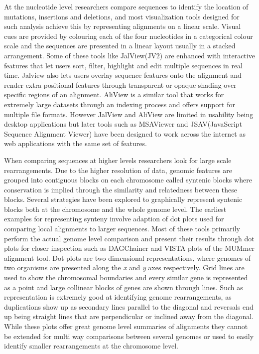At the nucleotide level researchers compare sequences to identify the location of mutations, insertions and deletions, and most visualization tools designed for such analysis achieve this by representing alignments on a linear scale. Visual cues are provided by colouring each of the four nucleotides in a categorical colour scale and the sequences are presented in a linear layout usually in a stacked arrangement. Some of these tools like JalView(JV2)\cite{waterhouse2009jalview} are enhanced with interactive features that let users sort, filter, highlight and edit multiple sequences in real time. Jalview also lets users overlay sequence features onto the alignment and render extra positional features through transparent or opaque shading over specific regions of an alignment. AliView is a similar tool that works for extremely large datasets through an indexing process and offers support for multiple file formats\cite{larsson2014aliview}. However JalView and AliView are limited in usability being desktop applications but later tools such as MSAViewer\cite{yachdav2016msaviewer} and JSAV(JavaScript Sequence Alignment Viewer)\cite{martin2014viewing} have been designed to work across the internet as web applications with the same set of features.

When comparing sequences at higher levels researchers look for large scale rearrangements. Due to the higher resolution of data, genomic features are grouped into contiguous blocks on each chromosome called syntenic blocks where conservation is implied through the similarity and relatedness between these blocks.
Several strategies have been explored to graphically represent syntenic blocks both at the chromosome and the whole genome level. The earliest examples for representing synteny involve adaption of dot plots used for comparing local alignments to larger sequences. Most of these tools primarily perform the actual genome level comparison and present their results through dot plots for closer inspection such as DAGChainer\cite{haas2004dagchainer} and VISTA plots of the MUMmer alignment tool\cite{kurtz2004versatile}. Dot plots are two dimensional representations, where genomes of two organisms are presented along the \textit{x} and \textit{y} axes respectively. Grid lines are used to show the chromosomal boundaries and every similar gene is represented as a point and large collinear blocks of genes are shown through lines. Such as representation is extremely good at identifying genome rearrangements, as duplications show up as  secondary lines parallel to the diagonal and reversals end up being straight lines that are perpendicular or inclined away from the diagonal. While these plots offer great genome level summaries of alignments they cannot be extended for multi way comparisons between several genomes or used to easily identify smaller rearrangements at the chromosome level.


